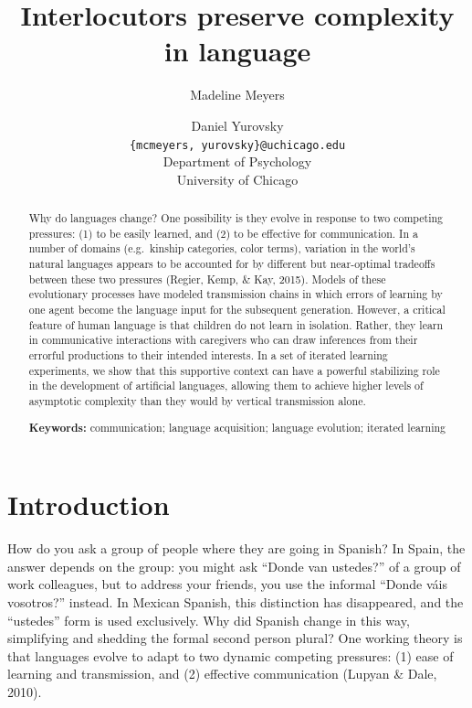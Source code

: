 \documentclass[10pt, letterpaper]{article}
\title{Interlocutors preserve complexity in language}
\author{Madeline Meyers \and Daniel Yurovsky \\
        \texttt{\{mcmeyers, yurovsky\}@uchicago.edu} \\
       Department of Psychology \\ University of Chicago}
\begin{document}
\maketitle

\begin{abstract}
Why do languages change? One possibility is they evolve in response to
two competing pressures: (1) to be easily learned, and (2) to be
effective for communication. In a number of domains (e.g.~kinship
categories, color terms), variation in the world's natural languages
appears to be accounted for by different but near-optimal tradeoffs
between these two pressures (Regier, Kemp, \& Kay, 2015). Models of
these evolutionary processes have modeled transmission chains in which
errors of learning by one agent become the language input for the
subsequent generation. However, a critical feature of human language is
that children do not learn in isolation. Rather, they learn in
communicative interactions with caregivers who can draw inferences from
their errorful productions to their intended interests. In a set of
iterated learning experiments, we show that this supportive context can
have a powerful stabilizing role in the development of artificial
languages, allowing them to achieve higher levels of asymptotic
complexity than they would by vertical transmission alone.

\textbf{Keywords:}
communication; language acquisition; language evolution; iterated
learning
\end{abstract}

\section{Introduction}\label{introduction}

How do you ask a group of people where they are going in Spanish? In
Spain, the answer depends on the group: you might ask ``Donde van
ustedes?'' of a group of work colleagues, but to address your friends,
you use the informal ``Donde váis vosotros?'' instead. In Mexican
Spanish, this distinction has disappeared, and the ``ustedes'' form is
used exclusively. Why did Spanish change in this way, simplifying and
shedding the formal second person plural? One working theory is that
languages evolve to adapt to two dynamic competing pressures: (1) ease
of learning and transmission, and (2) effective communication (Lupyan \&
Dale, 2010).
\end{document}
